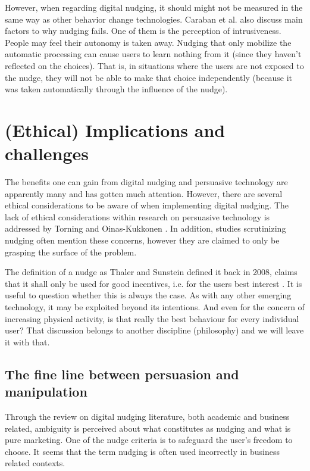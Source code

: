 However, when regarding digital nudging, it should might not be measured in the same way as other behavior change technologies. Caraban et al. also discuss main factors to why nudging fails. One of them is the perception of intrusiveness. People may feel their autonomy is taken away. Nudging that only mobilize the automatic processing can cause users to learn nothing from it (since they haven't reflected on the choices). That is, in situations where the users are not exposed to the nudge, they will not be able to make that choice independently (because it was taken automatically through the influence of the nudge). 

\section{(Ethical) Implications and challenges}
The benefits one can gain from digital nudging and persuasive technology are apparently many and has gotten much attention. However, there are several ethical considerations to be aware of when implementing digital nudging. The lack of ethical considerations within research on persuasive technology is addressed by Torning and Oinas-Kukkonen 
\cite{torning_pdf_2009}.
In addition, studies scrutinizing nudging often mention these concerns, however they are claimed to only be grasping the surface of the problem. 

The definition of a nudge as Thaler and Sunstein defined it back in 2008, claims that it shall only be used for good incentives, i.e. for the users best interest \cite{thaler_nudge-_2009}. It is useful to question whether this is always the case. As with any other emerging technology, it may be exploited beyond its intentions. And even for the concern of increasing physical activity, is that really the best behaviour for every individual user? That discussion belongs to another discipline (philosophy) and we will leave it with that. 

\subsection{The fine line between persuasion and manipulation}
Through the review on digital nudging literature, both academic and business related, ambiguity is perceived about what constitutes as nudging and what is pure marketing. One of the nudge criteria is to safeguard the user's freedom to choose. It seems that the term nudging is often used incorrectly in business related contexts. 

